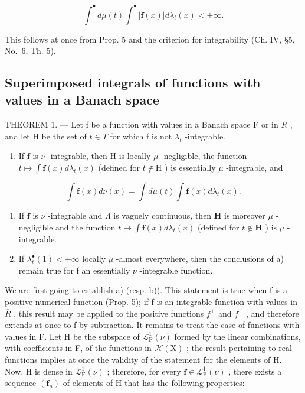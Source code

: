 \[
\int^ {\bullet} d \mu (t) \int^ {\bullet} | \mathbf {f} (x) | d \lambda_ {t} (x) <   + \infty .
\]

This follows at once from Prop. 5 and the criterion for integrability (Ch. IV, §5, No.~6, Th. 5).

\subsection{Superimposed integrals of functions with values in a Banach space}

THEOREM 1. --- Let f be a function with values in a Banach space F or in \(\overline{R}\) , and let H be the set of \(t \in T\) for which f is not \(\lambda_{t}\) -integrable.

\begin{enumerate}
\def\labelenumi{\alph{enumi})}
\tightlist
\item
  If \(\mathbf{f}\) is \(\nu\) -integrable, then \(\mathrm{H}\) is locally \(\mu\) -negligible, the function \(t \mapsto \int \mathbf{f}(x)d\lambda_t(x)\) (defined for \(t \notin \mathrm{H}\) ) is essentially \(\mu\) -integrable, and
\end{enumerate}

\[
\int \mathbf {f} (x) d \nu (x) = \int d \mu (t) \int \mathbf {f} (x) d \lambda_ {t} (x).\tag{11}
\]

\begin{enumerate}
\def\labelenumi{\alph{enumi})}
\setcounter{enumi}{1}
\item
  If \(\mathbf{f}\) is \(\nu\) -integrable and \(\Lambda\) is vaguely continuous, then \(\mathbf{H}\) is moreover \(\mu\) -negligible and the function \(t \mapsto \int \mathbf{f}(x) d\lambda_t(x)\) (defined for \(t \notin \mathbf{H}\) ) is \(\mu\) -integrable.
\item
  If \(\lambda_t^\bullet(1) < +\infty\) locally \(\mu\) -almost everywhere, then the conclusions of a) remain true for f an essentially \(\nu\) -integrable function.
\end{enumerate}

We are first going to establish a) (resp. b)). This statement is true when f is a positive numerical function (Prop. 5); if f is an integrable function with values in \(\overline{R}\) , this result may be applied to the positive functions \(f^{+}\) and \(f^{-}\) , and therefore extends at once to f by subtraction. It remains to treat the case of functions with values in F. Let H be the subspace of \(\mathcal{L}_{\mathrm{F}}^{1}(\nu)\) formed by the linear combinations, with coefficients in F, of the functions in \(\mathcal{H}(\mathrm{X})\) ; the result pertaining to real functions implies at once the validity of the statement for the elements of H. Now, H is dense in \(\mathcal{L}_{\mathrm{F}}^{1}(\nu)\) ; therefore, for every \(\mathbf{f} \in \mathcal{L}_{\mathrm{F}}^{1}(\nu)\) , there exists a sequence \((\mathbf{f}_{n})\) of elements of H that has the following properties:

